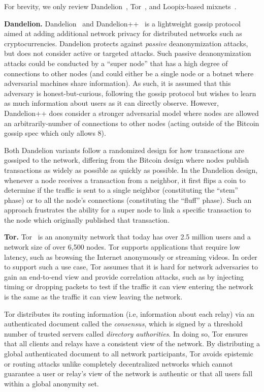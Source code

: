 \documentclass{article}
\begin{document}
For brevity, we only review
Dandelion~\cite{Fanti:2018:DLC,BojjaVenkatakrishnan:2017:DRB},
Tor~\cite{tor-specification}, and
Loopix-based mixnets~\cite{Piotrowska:2017:LAS}.

\textbf{Dandelion.}
Dandelion~\cite{BojjaVenkatakrishnan:2017:DRB} and
Dandelion++~\cite{Fanti:2018:DLC} is a lightweight gossip protocol aimed at
adding additional network privacy for
distributed networks such as cryptocurrencies. Dandelion protects against
\emph{passive}
deanonymization attacks, but does not consider active or targeted attacks. Such
passive deanonymization attacks could be conducted by a ``super node'' that has
a high degree of connections to other nodes (and could either be a single node
or a botnet where adversarial machines share information). As such, it is
assumed that this adversary is honest-but-curious, following the gossip protocol
but wishes to learn as much information about users as it can directly observe.
However, Dandelion++ does consider a stronger adversarial model where nodes are
allowed an arbitrarily-number of connections to other nodes (acting outside of the
Bitcoin gossip spec which only allows 8).

Both Dandelion variants follow a randomized design for how transactions are
gossiped to the network, differing from the Bitcoin design where nodes publish
transactions as widely as possible as quickly as possible. In the Dandelion
design, whenever a node receives a transaction from a neighbor, it
first flips a coin to determine if the traffic is sent to a single
neighbor (constituting the ``stem'' phase) or to all the node's connections
(constituting the ``fluff'' phase). Such an approach frustrates the ability for
a super node to link a specific transaction to the node which originally
published that transaction.


\textbf{Tor.}
Tor~\cite{tor-specification} is an anonymity network that today has over 2.5
million users and a network
size of over 6,500 nodes. Tor supports applications that require low latency,
such as browsing the Internet anonymously or streaming videos. In order to
support such a use case, Tor assumes that it is hard for network adversaries to
gain an end-to-end view and provide correlation attacks, such as by injecting
timing or dropping packets to test if the traffic it can view entering the
network is the same as the traffic it can view leaving the network.

Tor distributes its routing information (i.e, information about each relay) via
an authenticated document called the \emph{consensus}, which is signed by a
threshold number of trusted servers called \emph{directory authorities}. In
doing so, Tor ensures that all clients and relays have a consistent view of the
network. By distributing a global authenticated document to all network
participants, Tor avoids epistemic or routing attacks unlike completely
decentralized networks which cannot guarantee a user or relay's view of the
network is authentic or that all users fall within a global anonymity set.
\end{document}
